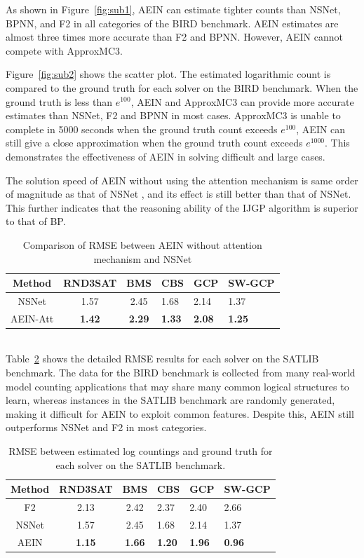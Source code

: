 As shown in Figure~\ref{fig:sub1}, AEIN can estimate tighter counts than NSNet, BPNN, and F2 in all categories 
of the BIRD benchmark. AEIN estimates are almost three times more accurate than F2 and BPNN. However, AEIN cannot 
compete with ApproxMC3.

Figure~\ref{fig:sub2} shows the scatter plot. The estimated logarithmic count is compared to the ground truth 
for each solver on the BIRD benchmark. When the ground truth is less than \(e^{100}\), AEIN and ApproxMC3 can 
provide more accurate estimates than NSNet, F2 and BPNN in most cases. ApproxMC3 is unable to complete in 5000 
seconds when the ground truth count exceeds \(e^{100}\), AEIN can still give a close approximation when the ground 
truth count exceeds \(e^{1000}\). This demonstrates the effectiveness of AEIN in solving difficult and large cases.

The solution speed of AEIN without using the attention mechanism is same order of magnitude as that of NSNet , 
and its effect is still better than that of NSNet. This further indicates that the reasoning ability of the IJGP 
algorithm is superior to that of BP.

\begin{table}[htbp] 
  \centering  
  \caption{Comparison of RMSE between AEIN without attention mechanism and NSNet}  
  \begin{tabular}{ccclll}  
    \toprule
    Method& RND3SAT& BMS & CBS& GCP&SW-GCP\\  
    \midrule
    NSNet& 1.57& 2.45& 1.68& 2.14&1.37\\  
    AEIN-Att& \textbf{1.42}& \textbf{2.29}& \textbf{1.33}& \textbf{2.08}&\textbf{1.25}\\  
    \bottomrule
  \end{tabular}
  \label{tab1}  
\end{table}\\

Table~\ref{tab2} shows the detailed RMSE results for each solver on the SATLIB benchmark. The data for the BIRD benchmark 
is collected from many real-world model counting applications that may share many common logical structures to learn, whereas 
instances in the SATLIB benchmark are randomly generated, making it difficult for AEIN to exploit common features. Despite this, 
AEIN still outperforms NSNet and F2 in most categories.

\begin{table}[htbp] 
  \centering  
  \caption{RMSE between estimated log countings and ground truth for each solver on the SATLIB benchmark.}  
  \begin{tabular}{ccclll}  
    \toprule
    Method& RND3SAT& BMS & CBS& GCP&SW-GCP\\  
    \midrule
    F2& 2.13& 2.42& 2.37& 2.40&2.66\\  
    NSNet& 1.57& 2.45& 1.68& 2.14&1.37\\  
    AEIN& \textbf{1.15}& \textbf{1.66}& \textbf{1.20}& \textbf{1.96}&\textbf{0.96}\\  
    \bottomrule
  \end{tabular}
  \label{tab2}  
\end{table}\\

